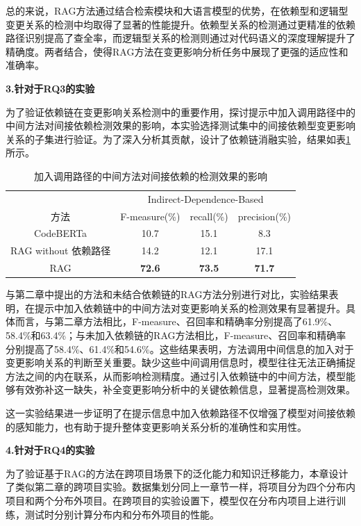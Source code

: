 总的来说，RAG方法通过结合检索模块和大语言模型的优势，在依赖型和逻辑型变更关系的检测中均取得了显著的性能提升。依赖型关系的检测通过更精准的依赖路径识别提高了查全率，而逻辑型关系的检测则通过对代码语义的深度理解提升了精确度。两者结合，使得RAG方法在变更影响分析任务中展现了更强的适应性和准确率。

\textbf{3.针对于RQ3的实验}

为了验证依赖链在变更影响关系检测中的重要作用，探讨提示中加入调用路径中的中间方法对间接依赖检测效果的影响，本实验选择测试集中的间接依赖型变更影响关系的子集进行验证。为了深入分析其贡献，设计了依赖链消融实验，结果如表\ref{2_消融实验}所示。

\begin{table}[htbp]
\caption{加入调用路径的中间方法对间接依赖的检测效果的影响}
\label{2_消融实验}
\vspace{0.5em}\centering\wuhao
\begin{tabular}{cccc }
\toprule
  & \multicolumn{3}{c}{Indirect-Dependence-Based}  \\
方法 & F-measure(\%) & recall(\%) & precision(\%) \\  
\midrule
CodeBERTa  &  10.7 & 15.1 & 8.3 \\
\midrule
RAG without 依赖路径  & 14.2 & 12.1 & 17.1 \\
RAG  & \textbf{72.6} & \textbf{73.5} & \textbf{71.7} \\
\bottomrule
\end{tabular}
\end{table}

与第二章中提出的方法和未结合依赖链的RAG方法分别进行对比，实验结果表明，在提示中加入依赖链中的中间方法对变更影响关系的检测效果有显著提升。具体而言，与第二章方法相比，F-measure、召回率和精确率分别提高了61.9\%、58.4\%和63.4\%；与未加入依赖链的RAG方法相比，F-measure、召回率和精确率分别提高了58.4\%、61.4\%和54.6\%。这些结果表明，方法调用中间信息的加入对于变更影响关系的判断至关重要。缺少这些中间调用信息时，模型往往无法正确捕捉方法之间的内在联系，从而影响检测精度。通过引入依赖链中的中间方法，模型能够有效弥补这一缺失，补全变更影响分析中的关键依赖信息，显著提高检测效果。

这一实验结果进一步证明了在提示信息中加入依赖路径不仅增强了模型对间接依赖的感知能力，也有助于提升整体变更影响关系分析的准确性和实用性。

\textbf{4.针对于RQ4的实验}

为了验证基于RAG的方法在跨项目场景下的泛化能力和知识迁移能力，本章设计了类似第二章的跨项目实验。数据集划分同上一章节一样，将项目分为四个分布内项目和两个分布外项目。在跨项目的实验设置下，模型仅在分布内项目上进行训练，测试时分别计算分布内和分布外项目的性能。

